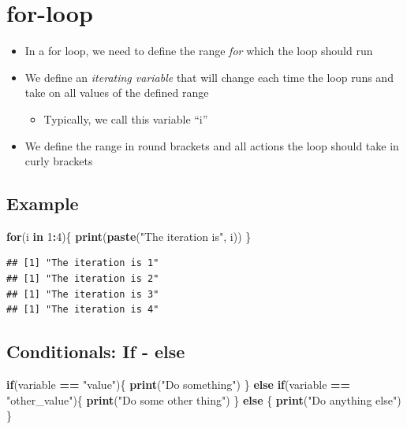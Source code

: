 \documentclass[
]{book}
\newenvironment{Shaded}{\begin{snugshade}}{\end{snugshade}}
\newcommand{\ControlFlowTok}[1]{\textcolor[rgb]{0.13,0.29,0.53}{\textbf{#1}}}
\newcommand{\DecValTok}[1]{\textcolor[rgb]{0.00,0.00,0.81}{#1}}
\newcommand{\FunctionTok}[1]{\textcolor[rgb]{0.13,0.29,0.53}{\textbf{#1}}}
\newcommand{\NormalTok}[1]{#1}
\newcommand{\SpecialCharTok}[1]{\textcolor[rgb]{0.81,0.36,0.00}{\textbf{#1}}}
\newcommand{\StringTok}[1]{\textcolor[rgb]{0.31,0.60,0.02}{#1}}
\providecommand{\tightlist}{%
  \setlength{\itemsep}{0pt}\setlength{\parskip}{0pt}}
\begin{document}
\section{for-loop}\label{for-loop}

\begin{itemize}
\tightlist
\item
  In a for loop, we need to define the range \emph{for} which the loop should run
\item
  We define an \emph{iterating variable} that will change each time the loop runs and take on all values of the defined range

  \begin{itemize}
  \tightlist
  \item
    Typically, we call this variable ``i''
  \end{itemize}
\item
  We define the range in round brackets and all actions the loop should take in curly brackets
\end{itemize}

\subsection{Example}\label{example-1}

\begin{Shaded}
\begin{Highlighting}[]
\ControlFlowTok{for}\NormalTok{(i }\ControlFlowTok{in} \DecValTok{1}\SpecialCharTok{:}\DecValTok{4}\NormalTok{)\{}
  \FunctionTok{print}\NormalTok{(}\FunctionTok{paste}\NormalTok{(}\StringTok{"The iteration is"}\NormalTok{, i))}
\NormalTok{\}}
\end{Highlighting}
\end{Shaded}

\begin{verbatim}
## [1] "The iteration is 1"
## [1] "The iteration is 2"
## [1] "The iteration is 3"
## [1] "The iteration is 4"
\end{verbatim}

\subsection{Conditionals: If - else}\label{conditionals-if---else}

\begin{Shaded}
\begin{Highlighting}[]
\ControlFlowTok{if}\NormalTok{(variable }\SpecialCharTok{==} \StringTok{"value"}\NormalTok{)\{}
  \FunctionTok{print}\NormalTok{(}\StringTok{"Do something"}\NormalTok{)}
\NormalTok{\} }\ControlFlowTok{else} \ControlFlowTok{if}\NormalTok{(variable }\SpecialCharTok{==} \StringTok{"other\_value"}\NormalTok{)\{}
  \FunctionTok{print}\NormalTok{(}\StringTok{"Do some other thing"}\NormalTok{)}
\NormalTok{\} }\ControlFlowTok{else}\NormalTok{ \{}
  \FunctionTok{print}\NormalTok{(}\StringTok{"Do anything else"}\NormalTok{)}
\NormalTok{\}}
\end{Highlighting}
\end{Shaded}
\end{document}
